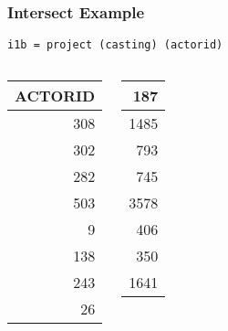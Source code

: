 \documentclass[dvipsnames]{beamer}
\theoremstyle{plain}
\begin{document}
\begin{frame}[fragile]
  \frametitle{Intersect Example}

  \begin{example}
    \begin{lstlisting}
i1b = project (casting) (actorid)
    \end{lstlisting}

    \pause
    \begin{columns}[b]
      \begin{tiny}
      \begin{table}
        \begin{tabular}{|r|}\hline
ACTORID\\\hline\hline
    308\\\hline
    302\\\hline
    282\\\hline
    503\\\hline
      9\\\hline
    138\\\hline
    243\\\hline
     26\\\hline
        \end{tabular}
      \end{table}
      \end{tiny}

      \begin{tiny}
      \begin{table}
        \begin{tabular}{|r|}\hline
    187\\\hline
   1485\\\hline
    793\\\hline
    745\\\hline
   3578\\\hline
    406\\\hline
    350\\\hline
   1641\\\hline
        \end{tabular}
      \end{table}
      \end{tiny}
    \end{columns}
  \end{example}
\end{frame}
\end{document}
